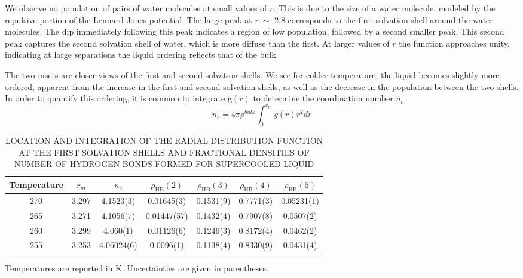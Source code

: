 We observe no population of pairs of water molecules at small values
of $r$. This is due to the size of a water molecule, modeled
by the repulsive portion of the Lennard-Jones potential. The large
peak at $r~\sim$ 2.8 corresponds to the first solvation
shell around the water molecules. The dip immediately following this
peak indicates a region of low population, followed by a second
smaller peak. This second peak captures the second solvation shell of
water, which is more diffuse than the first. At larger values of
$r$ the function approaches unity, indicating at large
separations the liquid ordering reflects that of the bulk. 

The two insets are closer views of the first and second solvation
shells. We see for colder temperature, the liquid becomes slightly
more ordered, apparent from the increase in the first and second
solvation shells, as well as the decrease in the population between
the two shells. In order to quantify this ordering, it is
common to integrate $\mathrm{g}(r)$ to determine the
coordination number $n_c$.
\begin{equation}\label{eq:nofr}
n_c = 4 \pi \rho^{bulk} \int_0^{r_m} g(r)r^2dr
\end{equation}


\begin{table}[h] \centering \caption{LOCATION AND INTEGRATION OF THE
    RADIAL DISTRIBUTION FUNCTION AT THE FIRST SOLVATION SHELLS AND
    FRACTIONAL DENSITIES OF NUMBER OF HYDROGEN BONDS FORMED FOR
    SUPERCOOLED LIQUID\label{tab:gofr}}
\begin{threeparttable}
\begin{tabular}{ccccccc}
  \hline
  \hline
  Temperature & $r_m$ & $n_c$ & $\rho_\mathrm{HB}(2)$ & $\rho_\mathrm{HB}(3)$ & $\rho_\mathrm{HB}(4)$ & $\rho_\mathrm{HB}(5)$ \\
  \hline
  270 & 3.297 &4.1523(3) & 0.01645(3) & 0.1531(9) & 0.7771(3) & 0.05231(1)\\
  265 & 3.271 & 4.1056(7) & 0.01447(57) & 0.1432(4) & 0.7907(8) & 0.0507(2)\\
  260 & 3.299 & 4.060(1) & 0.01126(6) & 0.1246(3) & 0.8172(4) & 0.0462(2)\\
  255 & 3.253 & 4.06024(6)  & 0.0096(1) & 0.1138(4) & 0.8330(9) &
                                                                  0.0431(4) \\
  \hline
  \hline
\end{tabular}
\begin{tablenotes}
      \small
    \item Temperatures are reported in K. Uncertainties are given in parentheses.
\end{tablenotes}
\end{threeparttable}
\end{table}

